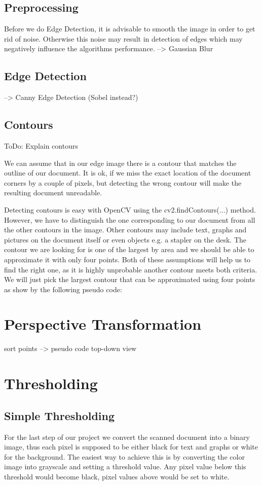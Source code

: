 \documentclass[bibliography=totoc]{scrartcl}
\begin{document}
		\subsection{Preprocessing}
		Before we do Edge Detection, it is advisable to smooth the image in order to get rid of noise. Otherwise this noise may result in detection of edges which may negatively influence the algorithms performance.
		--> Gaussian Blur
		\subsection{Edge Detection}
		--> Canny Edge Detection (Sobel instead?)
	
		\subsection{Contours}
		ToDo: Explain contours

		We can assume that in our edge image there is a contour that matches the outline of our document. 
		It is ok, if we miss the exact location of the document corners by a couple of pixels, but detecting the wrong contour will make the resulting document unreadable.

		Detecting contours is easy with OpenCV using the cv2.findContours(...) method.
		However, we have to distinguish the one corresponding to our document from all the other contours in the image.
		Other contours may include text, graphs and pictures on the document itself or even objects e.g. a stapler on the desk. 
		The contour we are looking for is one of the largest by area and we should be able to approximate it with only four points.
		Both of these assumptions will help us to find the right one, as it is highly unprobable another contour meets both criteria. 
		We will just pick the largest contour that can be approximated using four points as show by the following pseudo code:
		
	\section{Perspective Transformation}
	sort points --> pseudo code
	top-down view
	
	\section{Thresholding}
		\subsection{Simple Thresholding}
		For the last step of our project we convert the scanned document into a binary image, thus each pixel is supposed to be either black for text and graphs or white for the background.
		The easiest way to achieve this is by converting the color image into grayscale and setting a threshold value. 
		Any pixel value below this threshold would become black, pixel values above would be set to white.
\end{document}
